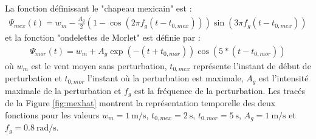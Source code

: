 La fonction définissant le "chapeau mexicain" est :
\begin{align}
    \label{eq:mex}
    \Psi_{mex}(t)= w_{m} - \frac{A_g}{2} \left(1-\cos(2 \pi f_g (t-t_{0,mex}))\right)\sin(3 \pi f_g (t-t_{0,mex}))
\end{align}
et la fonction "ondelettes de Morlet" est définie par :
\begin{align}
    \label{eq:morlet}
    \Psi_{mor}(t)=  w_{m} + A_g \exp(-(t+t_{0,mor})) \cos(5*(t-t_{0,mor}))
\end{align}
où $w_{m}$ est le vent moyen sans perturbation, $t_{0,mex}$ représente l'instant de début de perturbation et $t_{0,mor}$ l'instant où la perturbation est maximale, $A_g$ est l'intensité maximale de la perturbation et  $f_g$ est la fréquence de la perturbation. Les tracés de la Figure \ref{fig:mexhat} montrent la représentation temporelle des deux fonctions pour les valeurs $w_{m} = \SI{1}{\meter\per\second}$, $t_{0,mex} = \SI{2}{\second}$,  $t_{0,mor} = \SI{5}{\second}$, $A_g = \SI{1}{\meter\per\second}$ et $f_g = \SI{0.8}{\radian\per\second}$.








